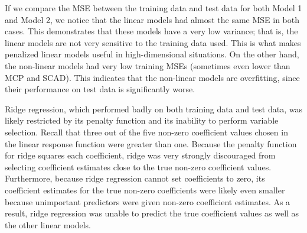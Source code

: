 \documentclass{article}
\begin{document}
	If we compare the MSE between the training data and test data for both Model 1 and Model 2, we notice that the linear models had almost the same MSE in both cases. This demonstrates that these models have a very low variance; that is, the linear models are not very sensitive to the training data used. This is what makes penalized linear models useful in high-dimensional situations. On the other hand, the non-linear models had very low training MSEs (sometimes even lower than MCP and SCAD). This indicates that the non-linear models are overfitting, since their performance on test data is significantly worse.
	
	Ridge regression, which performed badly on both training data and test data, was likely restricted by its penalty function and its inability to perform variable selection. Recall that three out of the five non-zero coefficient values chosen in the linear response function were greater than one. Because the penalty function for ridge squares each coefficient, ridge was very strongly discouraged from selecting coefficient estimates close to the true non-zero coefficient values. Furthermore, because ridge regression cannot set coefficients to zero, its coefficient estimates for the true non-zero coefficients were likely even smaller because unimportant predictors were given non-zero coefficient estimates. As a result, ridge regression was unable to predict the true coefficient values as well as the other linear models.
	

	
\end{document}
